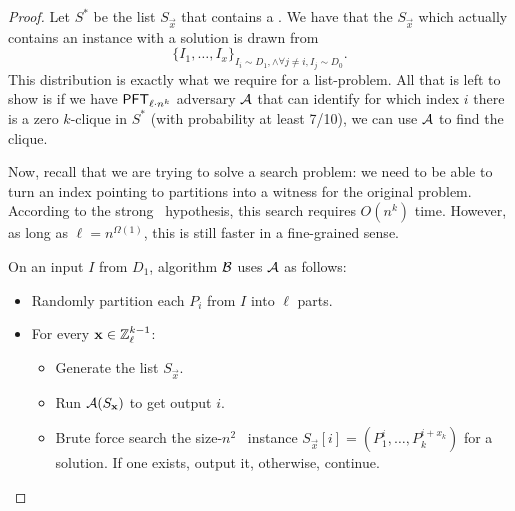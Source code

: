\begin{proof}
	Let $S^*$ be the list $S_{\vec x}$ that contains a \zkclique. We have that the $S_{\vec{x}}$ which actually contains an instance with a solution is drawn from
	\[ \{I_1, \dots, I_x\}_{I_i \sim D_{1}, \land \forall j \neq i, I_j \sim D_{0}}.\]
	This distribution is exactly what we require for a list-problem. All that is left to show is if we have $\mathsf{PFT}_{\ell \cdot n^k}$ adversary $\mathcal{A}$ that can identify for which index $i$ there is a zero $k$-clique in $S^*$ (with probability at least 7/10), we can use $\mathcal{A}$ to find the clique.
	
	
	
	
	
	Now, recall that we are trying to solve a search problem: we need to be able to turn an index pointing to partitions into a witness for the original problem. According to the strong \zkclique~hypothesis, this search requires $O(n^k)$ time. However, as long as $\ell = n^{\Omega(1)}$, this is still faster in a fine-grained sense.
	
	On an input $I$ from $D_1$, algorithm ${\cal B}$ uses $\mathcal{A}$ as follows:
	\begin{itemize}
		\item Randomly partition each $P_i$ from $I$ into $\ell$ parts.
		\item For every $\mathbf x \in \mathbb{Z}_{\ell}^{k-1}$:
		\begin{itemize}
			\item Generate the list $S_{\vec x}$.
			\item Run $\mathcal{A}(S_{\mathbf x})$ to get output $i$.
			\item Brute force search the size-$n^2$ \zkclique~instance $S_{\vec x}[i] = (P_1^i, \ldots, P_k^{i + x_k})$ for a solution. If one exists, output it, otherwise, continue.
		\end{itemize}
	\end{itemize}
	

\end{proof}
